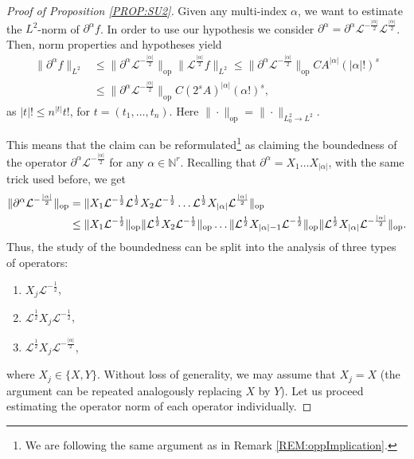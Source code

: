 \documentclass[12pt,oneside,a4paper]{book}
\numberwithin{equation}{section}     %
\theoremstyle{plain}
\theoremstyle{definition}
\DeclareMathOperator{\OP}{op}
\newcommand{\N}{{\mathbb N}}
\newcommand{\slp}{{\mathcal L}}
\begin{document}
\begin{proof}[Proof of Proposition \ref{PROP:SU2}]
	Given any multi-index $\alpha$, we want to estimate the $L^2$-norm of $\partial^\alpha f$. In order to use our hypothesis we consider $\partial^\alpha=\partial^\alpha\slp^{-\frac{|\alpha|}{2}}\slp^{\frac{|\alpha|}{2}}$. Then, norm properties and hypotheses yield
	\begin{align*}
	\|\partial^\alpha f\|_{L^2}&\leq\|\partial^\alpha\slp^{-\frac{|\alpha|}{2}}\|_{\OP}\|\slp^{\frac{|\alpha|}{2}}f\|_{L^2}\leq\|\partial^\alpha\slp^{-\frac{|\alpha|}{2}}\|_{\OP}CA^{|\alpha|}(|\alpha|!)^s\\
	&\leq\|\partial^\alpha\slp^{-\frac{|\alpha|}{2}}\|_{\OP}C(2^sA)^{|\alpha|}(\alpha!)^s,
	\end{align*}
	as $|t|!\leq n^{|t|}t!$, for $t=(t_1,\dots, t_n)$. Here $\|\cdot\|_{\OP}=\|\cdot\|_{L^2_0\rightarrow L^2}$.
	
	This means that the claim can be reformulated\footnote{We are following the same argument as in Remark \ref{REM:oppImplication}.} as claiming the boundedness of the operator $\partial^\alpha\slp^{-\frac{|\alpha|}{2}}$ for any $\alpha\in\N^r$. Recalling that $\partial^\alpha=X_1\dots X_{|\alpha|}$, with the same trick used before, we get
	\begin{align}\notag
	\|\partial^\alpha\slp^{-\frac{|\alpha|}{2}}\|_{\OP}&=\|X_1\slp^{-\frac{1}{2}}\slp^\frac{1}{2}X_2\slp^{-\frac{1}{2}}\dots\slp^\frac{1}{2}X_{|\alpha|}\slp^\frac{|\alpha|}{2}\|_{\OP}\\\notag
	&\leq\|X_1\slp^{-\frac{1}{2}}\|_{\OP}\|\slp^\frac{1}{2}X_2\slp^{-\frac{1}{2}}\|_{\OP}\dots\|\slp^\frac{1}{2}X_{|\alpha|-1}\slp^{-\frac{1}{2}}\|_{\OP}\|\slp^\frac{1}{2}X_{|\alpha|}\slp^{-\frac{|\alpha|}{2}}\|_{\OP}.
	\end{align} 
	Thus, the study of the boundedness can be split into the analysis of three types of operators:
	\begin{enumerate}[1.]
		\item $X_j\slp^{-\frac{1}{2}}$,
		\item $\slp^{\frac{1}{2}}X_j\slp^{-\frac{1}{2}}$,
		\item $\slp^{\frac{1}{2}}X_j\slp^{-\frac{|\alpha|}{2}}$,
	\end{enumerate} 
	where $X_j\in\{X,Y\}$. Without loss of generality, we may assume that $X_j=X$ (the argument can be repeated analogously replacing $X$ by $Y$). Let us proceed estimating the operator norm of each operator individually.
	

\end{proof}
\end{document}
